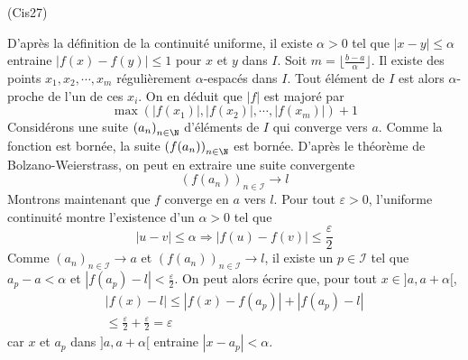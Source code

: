\begin{tiny}(Cis27)\end{tiny} D'après la définition de la continuité uniforme, il existe $\alpha >0$ tel que $|x-y|\leq \alpha$ entraine $|f(x)-f(y)|\leq 1$ pour $x$ et $y$ dans $I$. Soit $m=\lfloor\frac{b-a}{\alpha}\rfloor$. Il existe des points $x_1, x_2,\cdots,x_m$ régulièrement $\alpha$-espacés dans $I$. Tout élément de $I$ est alors $\alpha$-proche de l'un de ces $x_i$. On en déduit que $|f|$ est majoré par
\begin{displaymath}
 \max(|f(x_1)|,|f(x_2)|,\cdots,|f(x_m)|) + 1
\end{displaymath}
Considérons une suite $\left( a_n\right) _{n\in \N}$ d'éléments de $I$ qui converge vers $a$. Comme la fonction est bornée, la suite $\left( f(a_n)\right) _{n\in \N}$ est bornée. D'après le théorème de Bolzano-Weierstrass, on peut en extraire une suite convergente
\begin{displaymath}
 \left( f(a_n)\right) _{n\in \mathcal I} \rightarrow l
\end{displaymath}
Montrons maintenant que $f$ converge en $a$ vers $l$.\newline
Pour tout $\varepsilon >0$, l'uniforme continuité montre l'existence d'un $\alpha >0$ tel que
\begin{displaymath}
 |u -v|\leq \alpha \Rightarrow |f(u)-f(v)|\leq \frac{\varepsilon}{2}
\end{displaymath}
Comme $\left(a_n\right) _{n\in \mathcal I} \rightarrow a$ et $\left( f(a_n)\right) _{n\in \mathcal I} \rightarrow l$, il existe un $p\in \mathcal I$ tel que $a_p - a < \alpha$ et $|f(a_p)-l| < \frac{\varepsilon}{2}$. On peut alors écrire que, pour tout $x\in ]a,a+\alpha[$,
\begin{multline*}
|f(x)-l|\leq |f(x)-f(a_p)| + |f(a_p)-l| \\
\leq \frac{\varepsilon}{2} + \frac{\varepsilon}{2} = \varepsilon
\end{multline*}
car $x$ et $a_p$ dans $]a,a+\alpha[$ entraine $|x-a_p|<\alpha$.